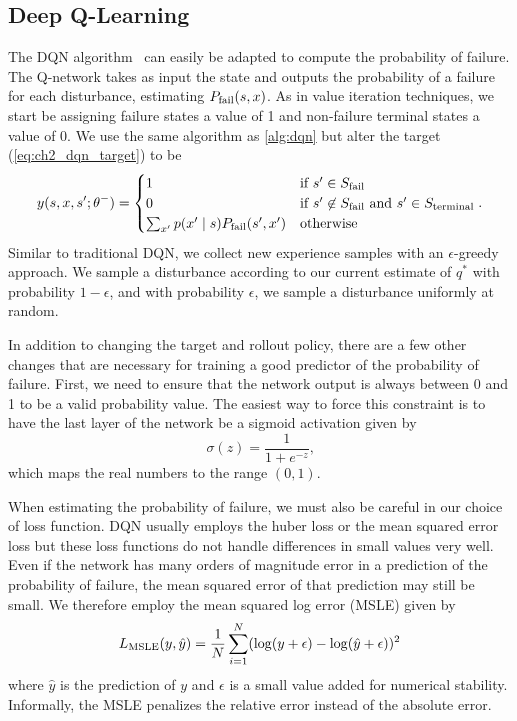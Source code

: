 \subsection{Deep Q-Learning}

The DQN algorithm~\cite{mnih2015human} can easily be adapted to compute the probability of failure. The Q-network takes as input the state and outputs the probability of a failure for each disturbance, estimating $P_{\rm fail}(s, x)$. As in value iteration techniques, we start be assigning failure states a value of \num{1} and non-failure terminal states a value of \num{0}. We use the same algorithm as \cref{alg:dqn} but alter the target (\cref{eq:ch2_dqn_target}) to be 
\begin{equation}
    y(s, x, s^\prime; \theta^-) = \begin{cases}
    1 & \text{if } s^\prime \in S_{\rm fail} \\ 
    0 & \text{if } s^\prime \not \in S_{\rm fail} \text{ and } s^\prime \in S_{\rm terminal} \\ 
    \sum_{x^\prime}p(x^\prime \mid s) P_{\rm fail}(s^\prime, x^\prime) & \text{otherwise} \\
    \end{cases} \text{.}
\end{equation}
Similar to traditional DQN, we collect new experience samples with an $\epsilon$-greedy approach. We sample a disturbance according to our current estimate of $q^*$ with probability $1-\epsilon$, and with probability $\epsilon$, we sample a disturbance uniformly at random.

In addition to changing the target and rollout policy, there are a few other changes that are necessary for training a good predictor of the probability of failure. First, we need to ensure that the network output is always between \num{0} and \num{1} to be a valid probability value. The easiest way to force this constraint is to have the last layer of the network be a sigmoid activation given by 
\begin{equation}
    \sigma(z) = \frac{1}{1 + e^{-z}} \text{,}
\end{equation}
which maps the real numbers to the range $(0,1)$. 

When estimating the probability of failure, we must also be careful in our choice of loss function. DQN usually employs the huber loss or the mean squared error loss but these loss functions do not handle differences in small values very well. Even if the network has many orders of magnitude error in a prediction of the probability of failure, the mean squared error of that prediction may still be small. We therefore employ the mean squared log error (MSLE) given by
\begin{equation}
    L_{\rm MSLE}(y, \hat{y}) = \frac{1}{N}\sum_{i=1}^N (\log(y + \epsilon) - \log(\hat{y} + \epsilon))^2
\end{equation}
where $\hat{y}$ is the prediction of $y$ and $\epsilon$ is a small value added for numerical stability. Informally, the MSLE penalizes the relative error instead of the absolute error. 

